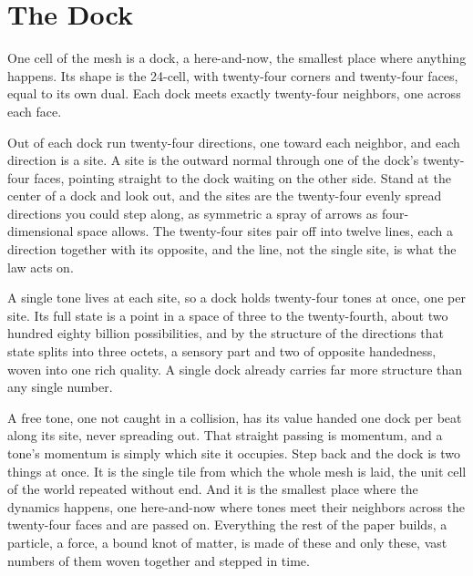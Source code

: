 \section{The Dock}

One cell of the mesh is a dock, a here-and-now, the smallest place where anything happens. Its shape is the 24-cell, with twenty-four corners and twenty-four faces, equal to its own dual. Each dock meets exactly twenty-four neighbors, one across each face.

Out of each dock run twenty-four directions, one toward each neighbor, and each direction is a site. A site is the outward normal through one of the dock's twenty-four faces, pointing straight to the dock waiting on the other side. Stand at the center of a dock and look out, and the sites are the twenty-four evenly spread directions you could step along, as symmetric a spray of arrows as four-dimensional space allows. The twenty-four sites pair off into twelve lines, each a direction together with its opposite, and the line, not the single site, is what the law acts on.

A single tone lives at each site, so a dock holds twenty-four tones at once, one per site. Its full state is a point in a space of three to the twenty-fourth, about two hundred eighty billion possibilities, and by the structure of the directions that state splits into three octets, a sensory part and two of opposite handedness, woven into one rich quality. A single dock already carries far more structure than any single number.

A free tone, one not caught in a collision, has its value handed one dock per beat along its site, never spreading out. That straight passing is momentum, and a tone's momentum is simply which site it occupies. Step back and the dock is two things at once. It is the single tile from which the whole mesh is laid, the unit cell of the world repeated without end. And it is the smallest place where the dynamics happens, one here-and-now where tones meet their neighbors across the twenty-four faces and are passed on. Everything the rest of the paper builds, a particle, a force, a bound knot of matter, is made of these and only these, vast numbers of them woven together and stepped in time.
